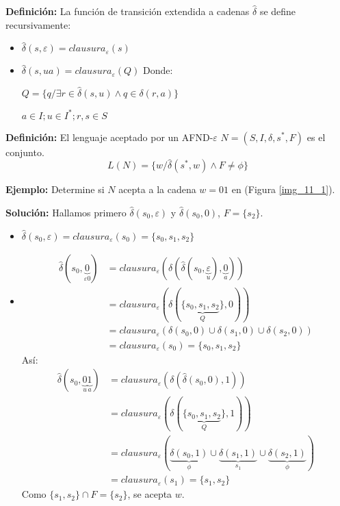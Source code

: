 \textbf{Definición: }La función de transición extendida a cadenas $\widehat{\delta}$ se define recursivamente:
\begin{itemize}
\item $\widehat{\delta}(s,\varepsilon)=clausura_\varepsilon(s)$
\item $\widehat{\delta}(s,ua)=clausura_\varepsilon(Q)$ Donde:

	$Q=\{q/\exists r\in \widehat{\delta}(s,u)\land q\in \delta(r,a)\}$
	
	$a\in I;u\in I^*;r,s\in S$ %
\end{itemize}

\textbf{Definición: }El lenguaje aceptado por un AFND-$\varepsilon$ $N=(S,I,\delta,s^*,F)$ es el conjunto.
$$L(N)=\{w/\widehat{\delta}(s^*,w)\land F\not= \phi\}$$

\textbf{Ejemplo: }Determine si $N$ acepta a la cadena $w=01$ en (Figura \ref{img_11_1}).

\textbf{Solución: }Hallamos primero $\widehat{\delta}(s_0,\varepsilon)$ y $\widehat{\delta}(s_0,0)$, $F=\{s_2\}$.
\begin{itemize}
\item $\widehat{\delta}(s_0,\varepsilon)=clausura_\varepsilon(s_0)=\{s_0,s_1,s_2\}$
\item \begin{align*}
\widehat{\delta}(s_0,\underbrace{0}_{\varepsilon 0})&=clausura_\varepsilon(\delta(\widehat{\delta}(s_0,\underbrace{\varepsilon}_{u}),\underbrace{0}_{a}))\\
&=clausura_\varepsilon(\delta(\{\underbrace{s_0,s_1,s_2}_{Q}\},0))\\
&=clausura_\varepsilon(\delta(s_0,0)\cup \delta(s_1,0)\cup \delta(s_2,0))\\
&=clausura_\varepsilon(s_0)=\{s_0,s_1,s_2\}
\end{align*}
Así:
\begin{align*}
\widehat{\delta}(s_0,\underbrace{0}_{u}\underbrace{1}_{a})&=clausura_\varepsilon(\delta(\widehat{\delta}(s_0,0),1))\\
&=clausura_\varepsilon(\delta(\{\underbrace{s_0,s_1,s_2}_{Q}\},1))\\
&=clausura_\varepsilon(\underbrace{\delta(s_0,1)}_{\phi}\cup \underbrace{\delta(s_1,1)}_{s_1}\cup \underbrace{\delta(s_2,1)}_{\phi})\\
&=clausura_\varepsilon(s_1)=\{s_1,s_2\}
\end{align*}
Como $\{s_1,s_2\}\cap F=\{s_2\}$, se acepta $w$.
\end{itemize}

